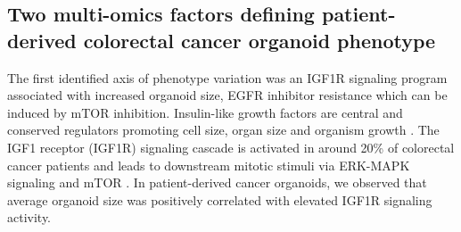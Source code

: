 \begin{flushleft}
\subsection{Two multi-omics factors defining patient-derived colorectal cancer organoid phenotype}

The first identified axis of phenotype variation was an IGF1R signaling program associated with increased organoid size, EGFR inhibitor resistance which can be induced by mTOR inhibition. Insulin-like growth factors are central and conserved regulators promoting cell size, organ size and organism growth \citep{pucheHumanConditionsInsulinlike2012, sunMechanismCellSize2006}. The IGF1 receptor (IGF1R) signaling cascade is activated in around 20\% of colorectal cancer patients and leads to downstream mitotic stimuli via ERK-MAPK signaling and mTOR \citep{zhongOverproductionIGF2Drives201}. In patient-derived cancer organoids, we observed that average organoid size was positively correlated with elevated IGF1R signaling activity.
\par


\end{flushleft}

